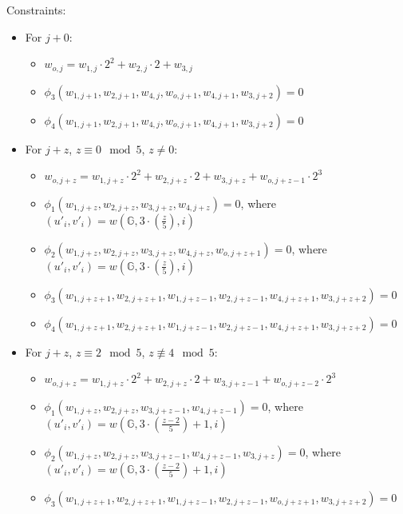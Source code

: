 Constraints:
\begin{itemize}
	\item For $j + 0$:
	\begin{itemize}
		\item $w_{o, j} = w_{1, j} \cdot 2^2 + w_{2, j} \cdot 2 + w_{3, j}$ 
		\item $\phi_3(w_{1, j + 1}, w_{2, j + 1}, w_{4, j}, w_{o, j + 1}, w_{4, j + 1}, w_{3, j + 2}) = 0$
		\item $\phi_4(w_{1, j + 1}, w_{2, j + 1}, w_{4, j}, w_{o, j + 1}, w_{4, j + 1}, w_{3, j + 2}) = 0$
	\end{itemize}
	\item For $j + z$, $z \equiv 0 \mod 5$, $z \neq 0$:
	\begin{itemize}
		\item $w_{o, j + z} = w_{1, j + z} \cdot 2^2 + w_{2, j + z} \cdot 2 + w_{3, j + z} + w_{o, j + z - 1} \cdot 2^3$ 
		\item $\phi_1(w_{1, j + z}, w_{2, j + z}, w_{3, j + z}, w_{4, j + z}) = 0$, where $(u'_{i}, v'_{i}) = w(\mathbb{G}, 3 \cdot (\frac{z}{5}), i)$
		\item $\phi_2(w_{1, j + z}, w_{2, j + z}, w_{3, j + z}, w_{4, j + z}, w_{o, j + z + 1}) = 0$, where $(u'_{i}, v'_{i}) = w(\mathbb{G}, 3 \cdot (\frac{z}{5}), i)$
		\item $\phi_3(w_{1, j + z + 1}, w_{2, j + z + 1}, w_{1, j + z - 1}, w_{2, j + z - 1}, w_{4, j + z + 1}, w_{3, j + z + 2}) = 0$
		\item $\phi_4(w_{1, j + z + 1}, w_{2, j + z + 1}, w_{1, j + z - 1}, w_{2, j + z - 1}, w_{4, j + z + 1}, w_{3, j + z + 2}) = 0$
	\end{itemize}
	\item For $j + z$, $z \equiv 2 \mod 5$, $z \not\equiv 4 \mod 5$:
	\begin{itemize}
		\item $w_{o, j + z} = w_{1, j + z} \cdot 2^2 + w_{2,j + z} \cdot 2 + w_{3, j + z - 1} + w_{o, j+ z - 2} \cdot 2^3$
		\item $\phi_1(w_{1, j + z}, w_{2, j + z}, w_{3, j + z - 1}, w_{4, j + z - 1}) = 0$, where $(u'_{i}, v'_{i}) = w(\mathbb{G}, 3 \cdot (\frac{z - 2}{5}) + 1, i)$
		\item $\phi_2(w_{1, j + z}, w_{2, j + z}, w_{3, j + z - 1}, w_{4, j + z - 1}, w_{3, j + z}) = 0$, where $(u'_{i}, v'_{i}) = w(\mathbb{G}, 3 \cdot (\frac{z - 2}{5}) + 1, i)$
		\item $\phi_3(w_{1, j + z + 1}, w_{2, j + z + 1}, w_{1, j + z - 1}, w_{2, j + z - 1}, w_{o, j + z + 1}, w_{3, j + z + 2}) = 0$

\end{itemize}
\end{itemize}
